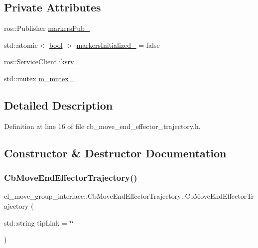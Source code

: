 \subsection*{Private Attributes}
\begin{DoxyCompactItemize}
\item 
ros\+::\+Publisher \hyperlink{classcl__move__group__interface_1_1CbMoveEndEffectorTrajectory_aabc2216b2d8625fecd83c5ec69928e63}{markers\+Pub\+\_\+}
\item 
std\+::atomic$<$ \hyperlink{classbool}{bool} $>$ \hyperlink{classcl__move__group__interface_1_1CbMoveEndEffectorTrajectory_ac140a7f0adfb20f1e2900a5c8cd2ca5b}{markers\+Initialized\+\_\+} = false
\item 
ros\+::\+Service\+Client \hyperlink{classcl__move__group__interface_1_1CbMoveEndEffectorTrajectory_a8a2e2225a5b53325241e45e4e28fa3a7}{iksrv\+\_\+}
\item 
std\+::mutex \hyperlink{classcl__move__group__interface_1_1CbMoveEndEffectorTrajectory_a2a98ef725cb3fc7f61654d3d6a2066bb}{m\+\_\+mutex\+\_\+}
\end{DoxyCompactItemize}


\subsection{Detailed Description}


Definition at line 16 of file cb\+\_\+move\+\_\+end\+\_\+effector\+\_\+trajectory.\+h.



\subsection{Constructor \& Destructor Documentation}
\mbox{\label{classcl__move__group__interface_1_1CbMoveEndEffectorTrajectory_af7e718b0c53e912fd74968abbb0a4810}} 
\subsubsection{\texorpdfstring{Cb\+Move\+End\+Effector\+Trajectory()}{CbMoveEndEffectorTrajectory()}\hspace{0.1cm}{\footnotesize\ttfamily [1/2]}}
{\footnotesize\ttfamily cl\+\_\+move\+\_\+group\+\_\+interface\+::\+Cb\+Move\+End\+Effector\+Trajectory\+::\+Cb\+Move\+End\+Effector\+Trajectory (\begin{DoxyParamCaption}\item[{std\+::string}]{tip\+Link = {\ttfamily \char`\"{}\char`\"{}} }\end{DoxyParamCaption})}



